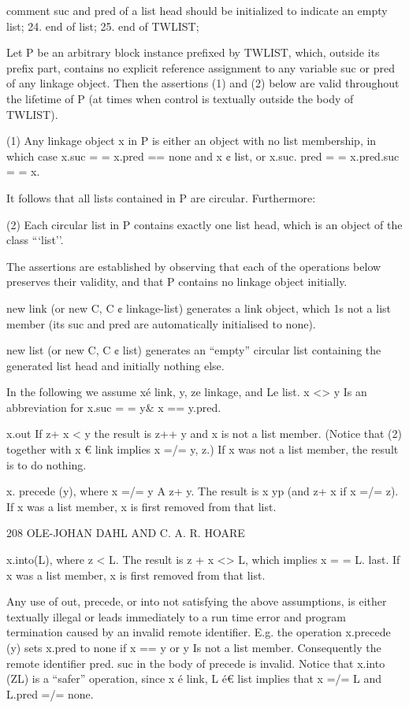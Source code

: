 {{{{{		comment suc and pred of a list head should be initialized to indicate an empty list; 24. end of list; 25. end of TWLIST;
		
		Let P be an arbitrary block instance prefixed by TWLIST, which, outside its prefix part, contains no explicit reference assignment to any variable suc or pred of any linkage object. Then the assertions (1) and (2) below are valid throughout the lifetime of P (at times when control is textually outside the body of TWLIST).
		
		(1) Any linkage object x in P is either an object with no list membership, in which case x.suc = = x.pred == none and x ¢ list, or x.suc. pred = = x.pred.suc = = x.
		
		It follows that all lists contained in P are circular. Furthermore:
		
		(2) Each circular list in P contains exactly one list head, which is an object of the class “‘list’’.
		
		The assertions are established by observing that each of the operations below preserves their validity, and that P contains no linkage object initially.
		
		new link (or new C, C ¢ linkage-list) generates a link object, which 1s not a list member (its suc and pred are automatically initialised to none).
		
		new list (or new C, C ¢ list) generates an “empty” circular list containing the generated list head and initially nothing else.
		
		In the following we assume xé link, y, ze linkage, and Le list. x <> y Is an abbreviation for x.suc = = y& x == y.pred.
		
		x.out If z+ x < y the result is z++ y and x is not a list member. (Notice that (2) together with x € link implies x =/= y, z.) If x was not a list member, the result is to do nothing.
		
		x. precede (y), where x =/= y A z+ y. The result is x yp (and z+ x if x =/= z). If x was a list member, x is first removed from that list.
		
		208 OLE-JOHAN DAHL AND C. A. R. HOARE
		
		x.into(L), where z < L. The result is z + x <> L, which implies x = = L. last. If x was a list member, x is first removed from that list.
		
		Any use of out, precede, or into not satisfying the above assumptions, is either textually illegal or leads immediately to a run time error and program termination caused by an invalid remote identifier. E.g. the operation x.precede (y) sets x.pred to none if x == y or y Is not a list member. Consequently the remote identifier pred. suc in the body of precede is invalid. Notice that x.into (ZL) is a “safer” operation, since x é link, L é€ list implies that x =/= L and L.pred =/= none.
		
}}}}}
